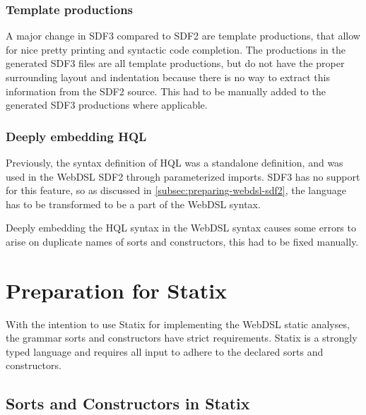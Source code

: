       \subsubsection{Template productions}

        A major change in SDF3 compared to SDF2 are template productions, that allow for nice pretty printing and syntactic code completion. The productions in the generated SDF3 files are all template productions, but do not have the proper surrounding layout and indentation because there is no way to extract this information from the SDF2 source. This had to be manually added to the generated SDF3 productions where applicable.

      \subsubsection{Deeply embedding HQL}

        Previously, the syntax definition of HQL was a standalone definition, and was used in the WebDSL SDF2 through parameterized imports. SDF3 has no support for this feature, so as discussed in \cref{subsec:preparing-webdsl-sdf2}, the language has to be transformed to be a part of the WebDSL syntax.
        
        Deeply embedding the HQL syntax in the WebDSL syntax causes some errors to arise on duplicate names of sorts and constructors, this had to be fixed manually.

  \section{\label{sec:preparation-for-statix}Preparation for Statix}

    With the intention to use Statix for implementing the WebDSL static analyses, the grammar sorts and constructors have strict requirements. Statix is a strongly typed language and requires all input to adhere to the declared sorts and constructors.

    \subsection{\label{subsec:sorts-in-statix}Sorts and Constructors in Statix}

